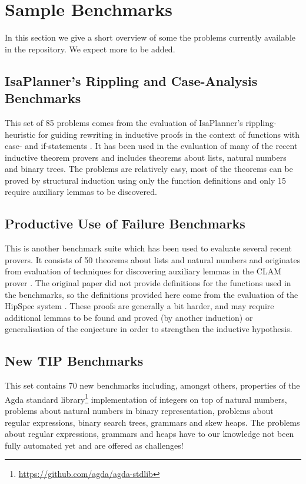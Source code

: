 \documentclass{llncs}
\begin{document}
\section{Sample Benchmarks}
In this section we give a short overview of  some the problems currently available in the repository. We expect more to be added.

\subsection{IsaPlanner's Rippling and Case-Analysis Benchmarks}
\label{sec:isap}
This set of 85 problems comes from the evaluation of IsaPlanner's rippling-heuristic for guiding rewriting in inductive proofs in the context of functions with case- and if-statements \cite{IsaPcase}. It has been used in the evaluation of many of the recent inductive theorem provers and includes theorems about lists, natural numbers and binary trees. The problems are relatively easy, most of the theorems can be proved by structural induction using only the function definitions and only 15 require auxiliary lemmas to be discovered.

\subsection{Productive Use of Failure Benchmarks}
This is another benchmark suite which has been used to evaluate several recent provers. It consists of 50 theorems about lists and natural numbers and originates from evaluation of techniques for discovering auxiliary lemmas in the CLAM prover \cite{productiveuse}. The original paper did not provide definitions for the functions used in the benchmarks, so the definitions provided here come from the evaluation of the HipSpec system \cite{hipspecCADE}. These proofs are generally a bit harder, and may require additional lemmas to be found and proved (by another induction) or generalisation of the conjecture in order to strengthen the inductive hypothesis.

\subsection{New TIP Benchmarks}
This set contains 70 new benchmarks including, amongst others,
properties of the Agda standard
library\footnote{\url{https://github.com/agda/agda-stdlib}}
implementation of integers on top of natural numbers, problems about natural numbers in binary representation, problems about regular expressions, binary search trees, grammars and skew heaps. The problems about regular expressions, grammars and heaps have to our knowledge not been fully automated yet and are offered as challenges!
\end{document}
